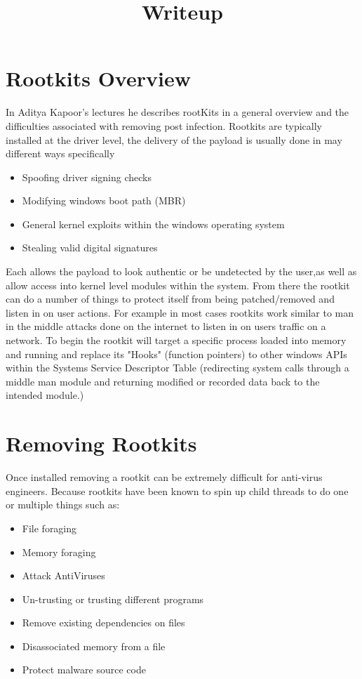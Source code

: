 \documentclass[letterpaper,12pt,titlepage,onecolumn]{IEEEtran}
\author{\name}
\title{Writeup}
\begin{document}
\maketitle
\hrulefill

\section{Rootkits Overview}
In Aditya Kapoor's lectures he describes rootKits in a general overview and the difficulties associated with removing post infection. Rootkits are typically installed at the driver level, the delivery of the payload is usually done in may different ways specifically
\begin{itemize}
    \item Spoofing driver signing checks
    \item Modifying windows boot path (MBR)
    \item General kernel exploits within the windows operating system
    \item Stealing valid digital signatures
\end{itemize}

Each allows the payload to look authentic or be undetected by the user,as well as allow access into kernel level modules within the system. From there the rootkit can do a number of things to protect itself from being patched/removed and listen in on user actions. For example in most cases rootkits work similar to man in the middle attacks done on the internet to listen in on users traffic on a network. To begin the rootkit will target a specific process loaded into memory and running and replace its "Hooks" (function pointers) to other windows APIs within the Systems Service Descriptor Table (redirecting system calls through a middle man module and returning modified or recorded data back to the intended module.)  

\section{Removing Rootkits}
Once installed removing a rootkit can be extremely difficult for anti-virus engineers. Because rootkits have been known to spin up child threads to do one or multiple things such as:
\begin{itemize}
    \item File foraging
    \item Memory foraging
    \item Attack AntiViruses
    \item Un-trusting or trusting different programs
    \item Remove existing dependencies on files
    \item Disassociated memory from a file
    \item Protect malware source code
\end{itemize}
\end{document}
